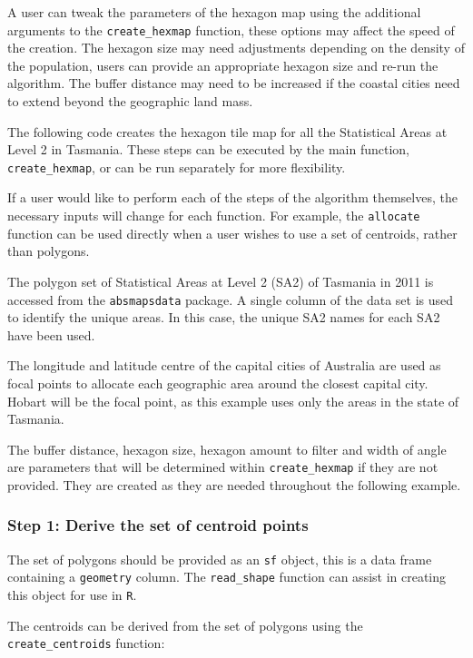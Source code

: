 A user can tweak the parameters of the hexagon map using the additional
arguments to the \texttt{create\_hexmap} function, these options may
affect the speed of the creation. The hexagon size may need adjustments
depending on the density of the population, users can provide an
appropriate hexagon size and re-run the algorithm. The buffer distance
may need to be increased if the coastal cities need to extend beyond the
geographic land mass.

The following code creates the hexagon tile map for all the Statistical
Areas at Level 2 in Tasmania. These steps can be executed by the main
function, \texttt{create\_hexmap}, or can be run separately for more
flexibility.

If a user would like to perform each of the steps of the algorithm
themselves, the necessary inputs will change for each function. For
example, the \texttt{allocate} function can be used directly when a user
wishes to use a set of centroids, rather than \citep{sf} polygons.

The polygon set of Statistical Areas at Level 2 (SA2) \citep{abs2011} of
Tasmania in 2011 is accessed from the \texttt{absmapsdata} package. A
single column of the data set is used to identify the unique areas. In
this case, the unique SA2 names for each SA2 have been used.

The longitude and latitude centre of the capital cities of Australia are
used as focal points to allocate each geographic area around the closest
capital city. Hobart will be the focal point, as this example uses only
the areas in the state of Tasmania.

The buffer distance, hexagon size, hexagon amount to filter and width of
angle are parameters that will be determined within
\texttt{create\_hexmap} if they are not provided. They are created as
they are needed throughout the following example.

\hypertarget{step-1-derive-the-set-of-centroid-points}{%
\subsubsection{Step 1: Derive the set of centroid
points}\label{step-1-derive-the-set-of-centroid-points}}

The set of polygons should be provided as an \texttt{sf} object, this is
a data frame containing a \texttt{geometry} column. The
\texttt{read\_shape} function can assist in creating this object for use
in \texttt{R}.

The centroids can be derived from the set of polygons using the
\texttt{create\_centroids} function:


